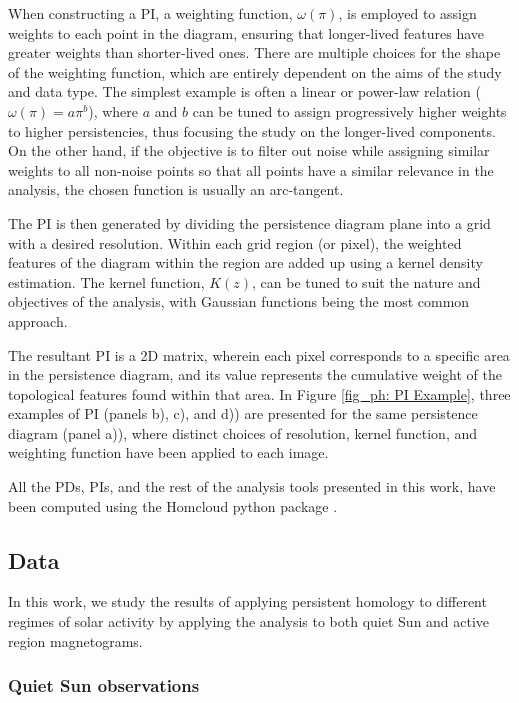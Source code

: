When constructing a PI, a weighting function, $\omega (\pi)$, is employed to assign weights to each point in the diagram, ensuring that longer-lived features have greater weights than shorter-lived ones. There are multiple choices for the shape of the weighting function, which are entirely dependent on the aims of the study and data type. The simplest example is often a linear or power-law relation ($\omega (\pi) = a \pi ^b$), where $a$ and $b$ can be tuned to assign progressively higher weights to higher persistencies, thus focusing the study on the longer-lived components. On the other hand, if the objective is to filter out noise while assigning similar weights to all non-noise points so that all points have a similar relevance in the analysis, the chosen function is usually an arc-tangent.

The PI is then generated by dividing the persistence diagram plane into a grid with a desired resolution. Within each grid region (or pixel), the weighted features of the diagram within the region are added up using a kernel density estimation. The kernel function, $K (z)$, can be tuned to suit the nature and objectives of the analysis, with Gaussian functions being the most common approach. 

The resultant PI is a 2D matrix, wherein each pixel corresponds to a specific area in the persistence diagram, and its value represents the cumulative weight of the topological features found within that area. In Figure \ref{fig_ph: PI Example}, three examples of PI (panels b), c), and d)) are presented for the same persistence diagram (panel a)), where distinct choices of resolution, kernel function, and weighting function have been applied to each image.




All the PDs, PIs, and the rest of the analysis tools presented in this work, have been computed using the Homcloud python package \citep{homcloud}.


\subsection{Data}

In this work, we study the results of applying persistent homology to different regimes of solar activity by applying the analysis to both quiet Sun and active region magnetograms.

\subsubsection{Quiet Sun observations}

